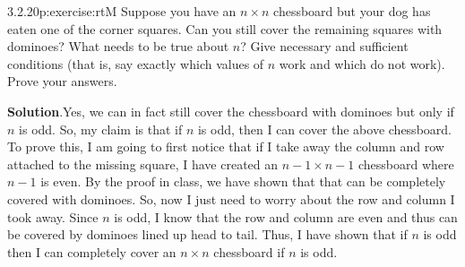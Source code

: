 \documentclass[twoside,11pt,]{book}
\newcommand{\blocktitlefont}{\relax}
\numberwithin{equation}{chapter}
\begin{document}
\begin{divisionsolution}{3.2.20}{}{p:exercise:rtM}%
Suppose you have an \(n\times n\) chessboard but your dog has eaten one of the corner squares. Can you still cover the remaining squares with dominoes? What needs to be true about \(n\)? Give necessary and sufficient conditions (that is, say exactly which values of \(n\) work and which do not work). Prove your answers.%
\begin{sidebyside}{1}{0.4}{0.4}{0}%
\begin{sbspanel}{0.2}%
%
\end{sbspanel}%
\end{sidebyside}%
\par\smallskip%
\noindent\textbf{\blocktitlefont Solution}.\quad{}Yes, we can in fact still cover the chessboard with dominoes but only if \(n\) is odd. So, my claim is that if \(n\) is odd, then I can cover the above chessboard. To prove this, I am going to first notice that if I take away the column and row attached to the missing square, I have created an \(n-1\times n-1\) chessboard where \(n-1\) is even. By the proof in class, we have shown that that can be completely covered with dominoes. So, now I just need to worry about the row and column I took away. Since \(n\) is odd, I know that the row and column are even and thus can be covered by dominoes lined up head to tail. Thus, I have shown that if \(n\) is odd then I can completely cover an \(n\times n\) chessboard if \(n\) is odd.%
\end{divisionsolution}%
\end{document}
